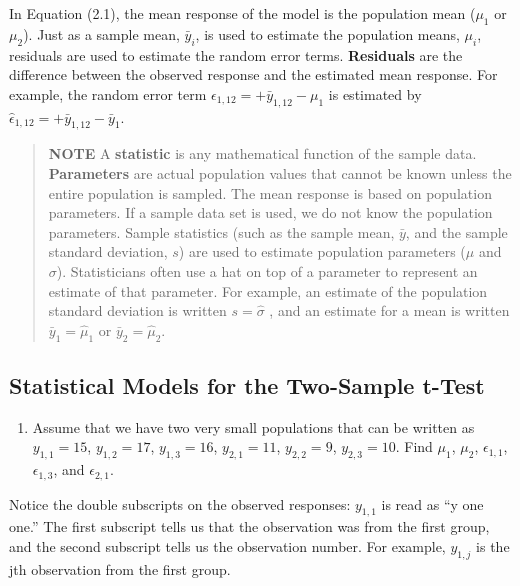\documentclass[
]{report}
\providecommand{\tightlist}{%
  \setlength{\itemsep}{0pt}\setlength{\parskip}{0pt}}
\begin{document}
In Equation (2.1), the mean response of the model is the population mean (\(\mu_1\) or \(\mu_2\)). Just as a sample mean, \(\bar{y}_i\), is used to estimate the population means, \(\mu_i\), residuals are used to estimate the random error terms. \textbf{Residuals} are the difference between the observed response and the estimated mean response. For example, the random error term \(\epsilon_{1, 12} = + \bar{y}_{1, 12} - \mu_1\) is estimated by \(\hat{\epsilon}_{1, 12} = + \bar{y}_{1, 12} - \bar{y}_1\).

\begin{quote}
\textbf{NOTE}
A \textbf{statistic} is any mathematical function of the sample data. \textbf{Parameters} are actual population values that cannot be known unless the entire population is sampled. The mean response is based on population parameters. If a sample data set is used, we do not know the population parameters. Sample statistics (such as the sample mean, \(\bar{y}\), and the sample standard deviation, \(s\)) are used to estimate population parameters (\(\mu\) and \(\sigma\)). Statisticians often use a hat on top of a parameter to represent an estimate of that parameter. For example, an estimate of the population standard deviation is written \(s = \hat{\sigma}\) , and an estimate for a mean is written \(\bar{y}_1 = \hat{\mu}_1\) or \(\bar{y}_2 = \hat{\mu}_2\).
\end{quote}

\subsection{Statistical Models for the Two-Sample t-Test}\label{statistical-models-for-the-two-sample-t-test}

\begin{enumerate}
\def\labelenumi{\arabic{enumi}.}
\setcounter{enumi}{4}
\tightlist
\item
  Assume that we have two very small populations that can be written as
  \(y_{1,1} = 15\), \(y_{1,2} = 17\), \(y_{1,3} = 16\), \(y_{2,1} = 11\), \(y_{2,2} = 9\), \(y_{2,3} = 10\). Find \(\mu_1\), \(\mu_2\), \(\epsilon_{1, 1}\), \(\epsilon_{1, 3}\), and \(\epsilon_{2, 1}\).
\end{enumerate}

Notice the double subscripts on the observed responses: \(y_{1,1}\) is read as ``y one one.'' The first subscript tells us that the observation was from the first group, and the second subscript tells us the observation number. For example, \(y_{1,j}\) is the jth observation from the first group.
\end{document}
